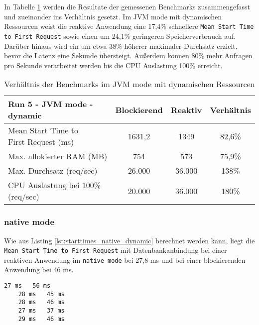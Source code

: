 In Tabelle \ref{table:dynamic_jvm_measurement_results} werden die Resultate der gemessenen Benchmarks zusammengefasst
und zueinander ins Verhältnis gesetzt.
Im JVM mode mit dynamischen Ressourcen weist die reaktive Anwendung
eine 17,4\% schnellere \verb|Mean Start Time to First Request| sowie einen um 24,1\% geringeren Speicherverbrauch auf.
Darüber hinaus wird ein um etwa 38\% höherer maximaler Durchsatz erzielt, bevor die Latenz eine Sekunde übersteigt.
Außerdem können 80\% mehr Anfragen pro Sekunde verarbeitet werden bis die CPU Auslastung 100\% erreicht.

\begin{table}[ht!]
  \begin{tabular}{|l | c | c | c|}
    \hline
    Run 5 - JVM mode - dynamic & Blockierend & Reaktiv & Verhältnis \\
    \hline
    \makecell[l]{Mean Start Time to                                 \\ First Request (ms)} &   1631,2    &  1349  &   82,6\%   \\
    \hline
    Max. allokierter RAM (MB)  & 754         & 573     & 75,9\%     \\
    \hline
    Max. Durchsatz (req/sec)   & 26.000      & 36.000  & 138\%      \\
    \hline
    \makecell[l]{CPU Auslastung bei 100\%                           \\ (req/sec)} & 20.000 & 36.000 & 180\%  \\
    \hline
  \end{tabular}
  \caption{Verhältnis der Benchmarks im JVM mode mit dynamischen Ressourcen}
  \label{table:dynamic_jvm_measurement_results}
\end{table}

\newpage
\subsubsection{native mode}
\label{subsubsec:dynamic_native_mode}
Wie aus Listing \ref{lst:starttimes_native_dynamic} berechnet werden kann, liegt die \verb|Mean Start Time to First Request|
mit Datenbankanbindung bei einer reaktiven Anwendung im \verb|native mode| bei 27,8 ms und bei
einer blockierenden Anwendung bei 46 ms.

\begin{lstlisting}[caption=Startzeiten im JVM mode mit dynamischen Ressourcen, captionpos=b, label=lst:starttimes_native_dynamic]
    27 ms   56 ms
    28 ms   45 ms
    28 ms   46 ms
    27 ms   37 ms
    29 ms   46 ms
\end{lstlisting}

